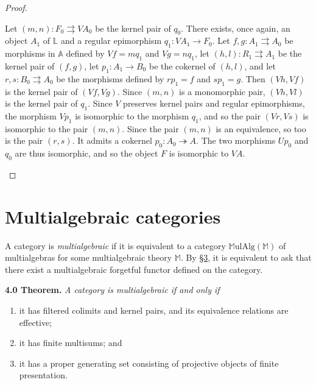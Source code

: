 \documentclass{article}
\newenvironment{itenv}[1]
  {\phantomsection\par\medskip\noindent\textbf{#1.}\itshape}
  {\par\medskip}
\newcommand{\bb}[1]{{\mathbb{#1}}}
\newcommand{\MulAlg}{\mathbb{M}\mathrm{ulAlg}}
\begin{document}
\begin{proof}
\begin{enumerate}[a)]
      Let $(m,n)\colon F_0\rightrightarrows VA_0$ be the kernel pair of $q_0$.
      There exists, once again, an object $A_1$ of $\bb{L}$ and a regular epimorphism $q_1\colon VA_1\to F_0$.
      Let $f,g\colon A_1\rightrightarrows A_0$ be morphisms in $\bb{A}$ defined by $Vf=mq_1$ and $Vg=nq_1$, let $(h,l)\colon R_1\rightrightarrows A_1$ be the kernel pair of $(f,g)$, let $p_1\colon A_1\to B_0$ be the cokernel of $(h,l)$, and let $r,s\colon B_0\rightrightarrows A_0$ be the morphisms defined by $rp_1=f$ and $sp_1=g$.
      Then $(Vh,Vf)$ is the kernel pair of $(Vf,Vg)$.
      Since $(m,n)$ is a monomorphic pair, $(Vh,Vl)$ is the kernel pair of $q_1$.
      Since $V$ preserves kernel pairs and regular epimorphisms, the morphism $Vp_1$ is isomorphic to the morphism $q_1$, and so the pair $(Vr,Vs)$ is isomorphic to the pair $(m,n)$.
      Since the pair $(m,n)$ is an equivalence, so too is the pair $(r,s)$.
      It admits a cokernel $p_0\colon A_0\twoheadrightarrow A$.
      The two morphisms $Up_0$ and $q_0$ are thus isomorphic, and so the object $F$ is isomorphic to $VA$.
  \end{enumerate}
\end{proof}



\section{Multialgebraic categories}
\label{4}

A category is \emph{multialgebraic} if it is equivalent to a category $\MulAlg(\bb{M})$ of multialgebras for some multialgebraic theory $\bb{M}$.
By \hyperref[3]{\S3}, it is equivalent to ask that there exist a multialgebraic forgetful functor defined on the category.

\begin{itenv}{4.0 Theorem}
\label{4.0}
  A category is multialgebraic if and only if
  \begin{enumerate}[1)]
    \item it has filtered colimits and kernel pairs, and its equivalence relations are effective;
    \item it has finite multisums; and
    \item it has a proper generating set consisting of projective objects of finite presentation.
  \end{enumerate}
\end{itenv}
\end{document}
